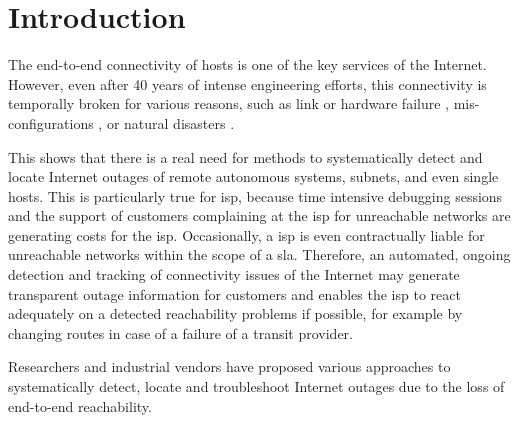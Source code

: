 \chapter{Introduction\label{Introduction}}

The end-to-end connectivity of hosts is one of the key services of the Internet. However, even after 40 years of intense engineering efforts, this connectivity is temporally broken for various reasons, such as link or hardware failure \citep{Markopoulou:2008}, mis-configurations \citep{Mahajan:2002}, or natural disasters \citep{Dainotti:2012:EBH,Schulman:2011}. 

This shows that there is a real need for methods to systematically detect and locate Internet outages of remote autonomous systems, subnets, and even single hosts. This is particularly true for \gls{isp}, because time intensive debugging sessions and the support of customers complaining at the \gls{isp} for unreachable networks are generating costs for the \gls{isp}. Occasionally, a \gls{isp} is even contractually liable for unreachable networks within the scope of a \gls{sla}. Therefore, an automated, ongoing detection and tracking of connectivity issues of the Internet may generate transparent outage information for customers and enables the \gls{isp} to react adequately on a detected reachability problems if possible, for example by changing routes in case of a failure of a transit provider. 

Researchers and industrial vendors have proposed various approaches to systematically detect, locate and troubleshoot Internet outages due to the loss of end-to-end reachability. 

